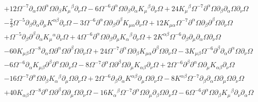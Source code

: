\documentclass[aps]{revtex4}
\begin{document}
\begin{align}
\nonumber\\
&+ 12 \Omega^{-7} \partial_{\alpha}\Omega \partial^{\alpha}\Omega \partial_{\beta}K_{\mu}{}^{\beta} \partial_{\nu}\Omega - 6 \Omega^{-6} \partial^{\alpha}\Omega \partial_{\beta}\partial_{\alpha}K_{\mu}{}^{\beta} \partial_{\nu}\Omega 
+ 24 K_{\mu}{}^{\beta} \Omega^{-7} \partial^{\alpha}\Omega \partial_{\beta}\partial_{\alpha}\Omega \partial_{\nu}\Omega 
\nonumber\\
&-  \tfrac{2}{3} \Omega^{-5} \partial_{\beta}\partial_{\alpha}\partial_{\mu}K^{\alpha \beta} \partial_{\nu}\Omega - 3 \Omega^{-6} \partial^{\alpha}\Omega \partial_{\beta}\partial^{\beta}K_{\mu \alpha} \partial_{\nu}\Omega + 12 K_{\mu \alpha} \Omega^{-7} \partial^{\alpha}\Omega \partial_{\beta}\partial^{\beta}\Omega \partial_{\nu}\Omega 
\nonumber\\
&+ \Omega^{-5} \partial_{\beta}\partial^{\beta}\partial_{\alpha}K_{\mu}{}^{\alpha} \partial_{\nu}\Omega + 4 \Omega^{-6} \partial^{\alpha}\Omega \partial_{\beta}\partial_{\mu}K_{\alpha}{}^{\beta} \partial_{\nu}\Omega + 2 K^{\alpha \beta} \Omega^{-6} \partial_{\beta}\partial_{\mu}\partial_{\alpha}\Omega \partial_{\nu}\Omega 
\nonumber\\
&- 60 K_{\mu \beta} \Omega^{-8} \partial_{\alpha}\Omega \partial^{\alpha}\Omega \partial^{\beta}\Omega \partial_{\nu}\Omega + 24 \Omega^{-7} \partial^{\alpha}\Omega \partial_{\beta}K_{\mu \alpha} \partial^{\beta}\Omega \partial_{\nu}\Omega - 3 K_{\mu \beta} \Omega^{-6} \partial^{\beta}\partial_{\alpha}\partial^{\alpha}\Omega \partial_{\nu}\Omega 
\nonumber\\
&- 6 \Omega^{-6} \partial_{\alpha}K_{\mu \beta} \partial^{\beta}\partial^{\alpha}\Omega \partial_{\nu}\Omega - 8 \Omega^{-7} \partial^{\alpha}\Omega \partial^{\beta}\Omega \partial_{\mu}K_{\alpha \beta} \partial_{\nu}\Omega + 2 \Omega^{-6} \partial^{\beta}\partial^{\alpha}\Omega \partial_{\mu}K_{\alpha \beta} \partial_{\nu}\Omega 
\nonumber\\
&- 16 \Omega^{-7} \partial^{\alpha}\Omega \partial_{\beta}K_{\alpha}{}^{\beta} \partial_{\mu}\Omega \partial_{\nu}\Omega + 2 \Omega^{-6} \partial_{\beta}\partial_{\alpha}K^{\alpha \beta} \partial_{\mu}\Omega \partial_{\nu}\Omega - 8 K^{\alpha \beta} \Omega^{-7} \partial_{\beta}\partial_{\alpha}\Omega \partial_{\mu}\Omega \partial_{\nu}\Omega 
\nonumber\\
&+ 40 K_{\alpha \beta} \Omega^{-8} \partial^{\alpha}\Omega \partial^{\beta}\Omega \partial_{\mu}\Omega \partial_{\nu}\Omega - 16 K_{\alpha}{}^{\beta} \Omega^{-7} \partial^{\alpha}\Omega \partial_{\mu}\partial_{\beta}\Omega \partial_{\nu}\Omega - 6 \Omega^{-6} \partial^{\alpha}\Omega \partial_{\beta}K_{\mu}{}^{\beta} \partial_{\nu}\partial_{\alpha}\Omega 

\end{align}
\end{document}
